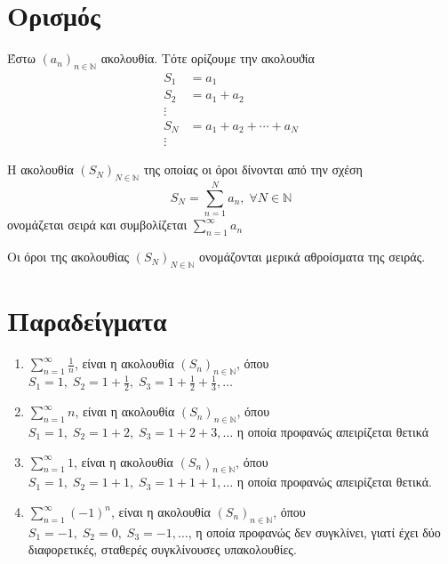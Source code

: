 





\setcounter{chapter}{3}


\section{Ορισμός}


\begin{mybox1}
\begin{dfn}
Έστω $ {(a_{n})}_{n \in \mathbb{N}}$ ακολουθία. Τότε ορίζουμε την ακολουϑία 
\begin{align*}
    S_{1} &= a_{1} \\
    S_{2} &= a_{1}+ a_{2} \\
    \vdots \\
    S_{N} &= a_{1}+ a_{2}+ \cdots + a_{N} \\
    \vdots 
\end{align*}

Η ακολουθία $ {(S_{N})}_{N \in \mathbb{N}} $ της οποίας οι όροι δίνονται από την 
σχέση \[ S_{N} = \sum_{n=1}^{N} a_{n}, \; \forall N \in \mathbb{N} \] ονομάζεται 
\textcolor{Col2}{σειρά} και συμβολίζεται
$
    \sum_{n=1}^{\infty} a_{n} 
$
\end{dfn}
\end{mybox1}

\begin{rem}
Οι όροι της ακολουθίας $ {(S_{N})}_{N \in \mathbb{N}} $ ονομάζονται 
\textcolor{Col2}{μερικά αθροίσματα} της σειράς.
\end{rem}

\section{Παραδείγματα}

\begin{enumerate}
    \item $ \sum_{n=1}^{\infty} \frac{1}{n} $, είναι η ακολουθία 
        $ {(S_{n})}_{n \in \mathbb{N}} $, όπου $ S_{1}=1, \; S_{2}=1+ \frac{1}{2}, \; 
        S_{3}= 1 + \frac{1}{2} + \frac{1}{3}, \ldots  $

    \item $ \sum_{n=1}^{\infty} n  $, είναι η ακολουθία ${(S_{n})}_{n \in \mathbb{N}}$,
        όπου $ S_{1}=1, \; S_{2}=1+2, \; S_{3}=1+2+3, \ldots $ η οποία προφανώς 
        απειρίζεται θετικά

    \item $ \sum_{n=1}^{\infty} 1  $, είναι η ακολουθία ${(S_{n})}_{n \in \mathbb{N}}$,
        όπου $ S_{1}=1, \; S_{2}=1+1, \; S_{3}=1+1+1, \ldots $ η οποία προφανώς 
        απειρίζεται θετικά.

    \item $ \sum_{n=1}^{\infty} {(-1)}^{n}  $, είναι η ακολουθία 
        $ {(S_{n})}_{n \in \mathbb{N}} $, όπου $ S_{1}=-1, \; S_{2}=0, \; S_{3}=-1, 
        \ldots $, η οποία προφανώς δεν συγκλίνει, γιατί έχει δύο διαφορετικές, σταθερές 
        συγκλίνουσες υπακολουθίες.
\end{enumerate}

